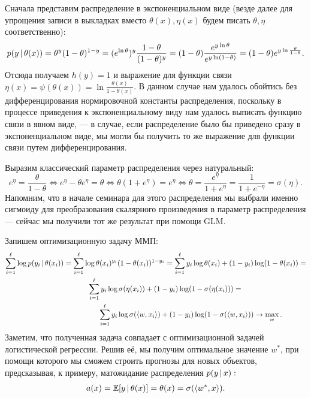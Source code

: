 \documentclass[12pt,a4paper]{article}
\begin{document}
    \begin{esSolution}
        Сначала представим распределение в экспоненциальном виде (везде далее для упрощения записи в выкладках вместо $\theta(x), \eta(x)$ будем писать $\theta, \eta$ соответственно):
        \begin{equation}
        p(y \mspace{3mu}{|}\mspace{3mu} \theta(x)) = \theta^y (1 - \theta)^{1 - y} = 
        (e^{\ln \theta})^y \frac{1 - \theta}{(1 - \theta)^y} =
        (1 - \theta) \frac{e^{y \ln \theta}}{e^{y \ln (1 - \theta)}} = 
        (1 - \theta) e^{y \ln \frac{\theta}{1 - \theta}}.
        \end{equation}
    Отсюда получаем $h(y) = 1$ и выражение для функции связи $\eta(x) = \psi(\theta(x)) =  \ln \frac{\theta(x)}{1 - \theta(x)}$. В данном случае нам удалось обойтись без дифференцирования нормировочной константы распределения, поскольку в процессе приведения к экспоненциальному виду нам удалось выписать функцию связи в явном виде, — в случае, если распределение было бы приведено сразу в экспоненциальном виде, мы могли бы получить то же выражение для функции связи путем дифференцирования.
    \par Выразим классический параметр распределения через натуральный:
    \begin{equation*}
        e^{\eta} = \frac{\theta}{1 - \theta} \Leftrightarrow 
        e^\eta - \theta e^\eta = \theta \Leftrightarrow
        \theta (1 + e^\eta) = e^\eta \Leftrightarrow
        \theta = \frac{e^\eta}{1 + e^\eta} = \frac{1}{1 + e^{-\eta}} = \sigma(\eta).
    \end{equation*}
    Напомним, что в начале семинара для этого распределения мы выбрали именно сигмоиду для преобразования скалярного произведения в параметр распределения — сейчас мы получили тот же результат при помощи GLM.
    
    Запишем оптимизационную задачу ММП:
    \begin{align*}
            \sum_{i=1}^\ell \log p(y_i \mspace{3mu}{|}\mspace{3mu} \theta(x_i)) = 
            \sum_{i=1}^\ell \log \theta(x_i)^{y_i} &(1 - \theta(x_i))^{1 - y_i} = 
            \sum_{i=1}^\ell y_i \log \theta(x_i) + (1 - y_i) \log (1 - \theta(x_i)) = \\
            \sum_{i=1}^\ell y_i \log & \, \sigma(\eta(x_i)) + (1 - y_i) \log (1 - \sigma(\eta(x_i))) =\\
            \sum_{i=1}^\ell y_i &\log \sigma(\langle w, x_i \rangle) + (1 - y_i) \log (1 - \sigma(\langle w, x_i \rangle)) \to \max_w.
    \end{align*}
    Заметим, что полученная задача совпадает с оптимизационной задачей логистической регрессии. Решив её, мы получим оптимальное значение $w^*$, при помощи которого мы сможем строить прогнозы для новых объектов, предсказывая, к примеру, матожидание распределения $p(y \mspace{3mu}{|}\mspace{3mu} x):$
    \begin{align*}
        a(x) = \mathbb{E}[y \mspace{3mu}{|}\mspace{3mu} \theta(x)] = \theta(x) = \sigma(\langle w^*, x \rangle).
    \end{align*}
    \end{esSolution}
\end{document}
